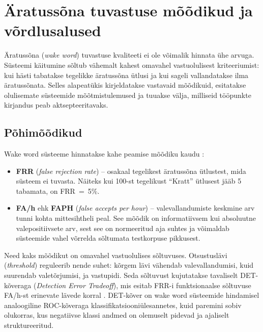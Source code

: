 %

\section{Äratussõna tuvastuse mõõdikud ja võrdlusalused}\label{sec:ww-benchmarks}

Äratussõna (\emph{wake word}) tuvastuse kvaliteeti ei ole võimalik hinnata ühe arvuga. Süsteemi käitumine sõltub vähemalt kahest omavahel vastuolulisest kriteeriumist: kui hästi tabatakse tegelikke äratussõna ütlusi ja kui sageli vallandatakse ilma äratussõnata. Selles alapeatükis kirjeldatakse vastavaid mõõdikuid, esitatakse olulisemate süsteemide mõõtmistulemused ja tuuakse välja, milliseid tööpunkte kirjandus peab aktsepteeritavaks.

\subsection{Põhimõõdikud}\label{subsec:metrics}

Wake word süsteeme hinnatakse kahe peamise mõõdiku kaudu \cite{lopezespejo2021deepkws,garai2025sfkws}:

\begin{itemize}
    \item \textbf{FRR} (\emph{false rejection rate}) -- osakaal tegelikest äratussõna ütlustest, mida süsteem ei tuvasta. Näiteks kui 100-st tegelikust \enquote{Kratt} ütlusest jääb 5 tabamata, on FRR~=~5\%.
    \item \textbf{FA/h} ehk \textbf{FAPH} (\emph{false accepts per hour}) -- valevallandumiste keskmine arv tunni kohta mittesihtheli peal. See mõõdik on informatiivsem kui absoluutne vale\-positiivsete arv, sest see on normeeritud aja suhtes ja võimaldab süsteemide vahel võrrelda sõltumata testkorpuse pikkusest.
\end{itemize}

Need kaks mõõdikut on omavahel vastuolulises sõltuvuses. Otsustuslävi (\emph{threshold}) reguleerib nende suhet: kõrgem lävi vähendab valevallandumisi, kuid suurendab valetõrjumisi, ja vastupidi. Seda sõltuvust kujutatakse tavaliselt DET-kõveraga (\emph{Detection Error Tradeoff}), mis esitab FRR-i funktsionaalse sõltuvuse FA/h-st erinevate lävede korral \cite{lopezespejo2021deepkws}. DET-kõver on wake word süsteemide hindamisel analoogiline ROC-kõveraga klassifikatsiooniülesannetes, kuid paremini sobiv olukorras, kus negatiivse klassi andmed on olemuselt pidevad ja ajaliselt struktureeritud.

